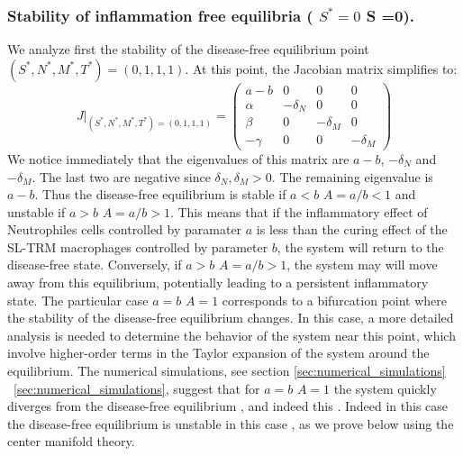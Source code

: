 \documentclass[a4paper, 12pt]{article}
\providecommand{\DIFaddtex}[1]{{\protect\color{blue} \sf #1}} %
\providecommand{\DIFdeltex}[1]{{\protect\color{red} \scriptsize #1}} %
\providecommand{\DIFaddbegin}{} %
\providecommand{\DIFaddend}{} %
\providecommand{\DIFdelbegin}{} %
\providecommand{\DIFdelend}{} %
\providecommand{\DIFadd}[1]{\texorpdfstring{\DIFaddtex{#1}}{#1}} %
\providecommand{\DIFdel}[1]{\texorpdfstring{\DIFdeltex{#1}}{}} %
\begin{document}
\subsubsection{Stability of  inflammation free equilibria (\DIFdelbegin \DIFdel{$S^* =0$}\DIFdelend \DIFaddbegin \DIFadd{S =0}\DIFaddend ).}\label{sec:stab}
We analyze first the stability of the disease-free equilibrium point $(S^*, N^*, M^*, T^*) = (0, 1, 1, 1)$.
At this point, the Jacobian matrix simplifies to:
\[
J|_{(S^*, N^*, M^*, T^*) = (0, 1, 1, 1)} =
\begin{pmatrix}
a - b & 0 & 0 & 0 \\
\alpha & - \delta_N & 0 & 0 \\
\beta & 0 & -\delta_M & 0 \\
-\gamma & 0 & 0 & -\delta_M
\end{pmatrix}
\]
We notice immediately that the eigenvalues of this matrix are  $a-b$, $-\delta_N$ and $-\delta_M$.
 The last two are negative since $\delta_N, \delta_M > 0$. The remaining eigenvalue  is $a-b$. Thus the disease-free equilibrium is stable if \DIFdelbegin \DIFdel{$a < b$ }\DIFdelend \DIFaddbegin \DIFadd{$A = a/b < 1$ }\DIFaddend and unstable if \DIFdelbegin \DIFdel{$a > b$}\DIFdelend \DIFaddbegin \DIFadd{$A =a/b > 1$}\DIFaddend . 
This means that if the inflammatory effect of Neutrophiles cells controlled by paramater $a$ is less than the curing effect of the  SL-TRM macrophages controlled by parameter $b$, the system will return to the disease-free state.
 Conversely, if \DIFdelbegin \DIFdel{$a > b$}\DIFdelend \DIFaddbegin \DIFadd{$A=a/b > 1$}\DIFaddend , the system \DIFdelbegin \DIFdel{may }\DIFdelend \DIFaddbegin \DIFadd{will }\DIFaddend move away from this equilibrium, potentially leading to a persistent inflammatory state.
The particular case \DIFdelbegin \DIFdel{$a = b$ }\DIFdelend \DIFaddbegin \DIFadd{$A=1$ }\DIFaddend corresponds to a bifurcation point where the stability of the disease-free equilibrium changes. In this case, a more detailed analysis is needed to determine the behavior of the system near this point, which  involve higher-order terms in the Taylor expansion of the system around the equilibrium.
The numerical simulations, see section\DIFdelbegin \DIFdel{\ref{sec:numerical_simulations} }\DIFdelend \DIFaddbegin \DIFadd{~\ref{sec:numerical_simulations}, }\DIFaddend suggest that for \DIFdelbegin \DIFdel{$a=b$ }\DIFdelend \DIFaddbegin \DIFadd{$A=1$ }\DIFaddend the system quickly diverges from the disease-free equilibrium\DIFdelbegin \DIFdel{, and indeed this }\DIFdelend \DIFaddbegin \DIFadd{. 
Indeed in this case the disease-free }\DIFaddend equilibrium is unstable\DIFdelbegin \DIFdel{in this case }\DIFdelend \DIFaddbegin \DIFadd{, }\DIFaddend as we prove below\DIFdelbegin \DIFdel{using the center manifold theory}\DIFdelend .
\end{document}
